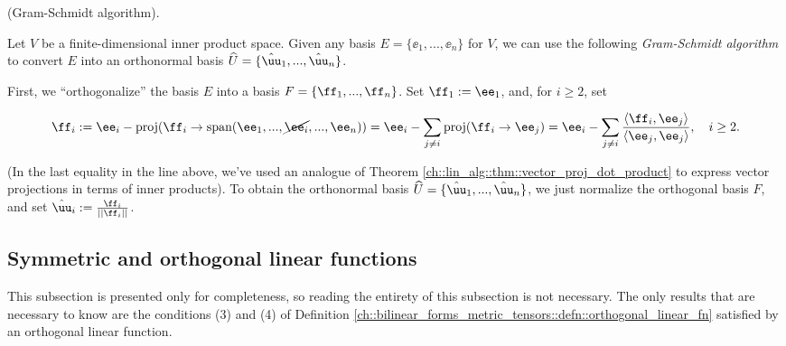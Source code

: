 \begin{theorem}
\label{ch::bilinear_forms_metric_tensors::theorem::Gram-Schmidt}
    (Gram-Schmidt algorithm).
    
    Let $V$ be a finite-dimensional inner product space. Given any basis $E = \{\ee_1, ..., \ee_n\}$ for $V$, we can use the following \textit{Gram-Schmidt algorithm} to convert $E$ into an orthonormal basis $\hU = \{\huu_1, ..., \huu_n\}$.
    
    First, we ``orthogonalize'' the basis $E$ into a basis $F = \{\ff_1, ..., \ff_n\}$. Set $\ff_1 := \ee_1$, and, for $i \geq 2$, set
    
    \begin{align*}
        \ff_i := \ee_i - \proj(\ff_i \rightarrow \spann(\ee_1, ..., \cancel{\ee_i}, ..., \ee_n)) = \ee_i - \sum_{j \neq i} \proj(\ff_i \rightarrow \ee_j) = \ee_i - \sum_{j \neq i} \frac{\langle \ff_i, \ee_j \rangle}{\langle \ee_j, \ee_j \rangle}, \quad i \geq 2.
    \end{align*}
    
    (In the last equality in the line above, we've used an analogue of Theorem \ref{ch::lin_alg::thm::vector_proj_dot_product} to express vector projections in terms of inner products). 
    To obtain the orthonormal basis $\hU = \{\huu_1, ..., \huu_n\}$, we just normalize the orthogonal basis $F$, and set $\huu_i := \frac{\ff_i}{||\ff_i||}$.
\end{theorem}

\subsection*{Symmetric and orthogonal linear functions}

This subsection is presented only for completeness, so reading the entirety of this subsection is not necessary. The only results that are necessary to know are the conditions (3) and (4) of Definition \ref{ch::bilinear_forms_metric_tensors::defn::orthogonal_linear_fn} satisfied by an orthogonal linear function.

